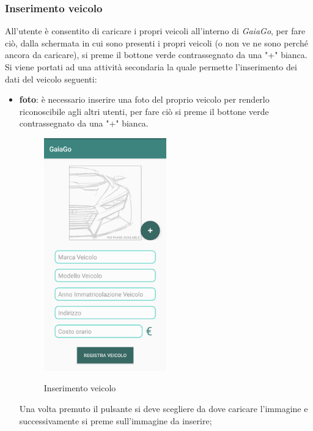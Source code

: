 \subsubsection{Inserimento veicolo}
All'utente è consentito di caricare i propri veicoli all'interno di \textit{GaiaGo}, per fare ciò, dalla schermata in cui sono presenti i propri veicoli (o non ve ne sono perché ancora da caricare), si preme il bottone verde contrassegnato da una "+" bianca.
Si viene portati ad una attività secondaria la quale permette l'inserimento dei dati del veicolo seguenti:
\begin{itemize}
	\item \textbf{foto}: è necessario inserire una foto del proprio veicolo per renderlo riconoscibile agli altri utenti, per fare ciò si preme il bottone verde contrassegnato da una "+" bianca.
	 \begin{figure}[H] 
		\centering 
		\includegraphics[width=0.5\textwidth]{res/images/caricamento_veicolo.png}\\
		\caption{Inserimento veicolo}
		\label{ins}
	\end{figure}
\pagebreak
Una volta premuto il pulsante si deve scegliere da dove caricare l'immagine e successivamente si preme sull'immagine da inserire;
 \begin{figure}[H] 
	\centering 

\end{figure}
\end{itemize}
